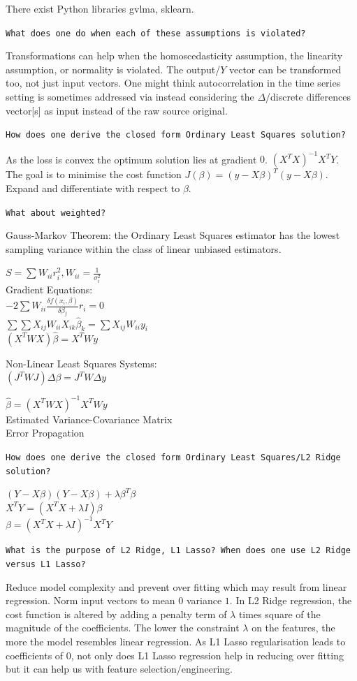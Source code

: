 There exist Python libraries gvlma, sklearn.

\texttt{What does one do when each of these assumptions is violated?}

Transformations can help when the homoscedasticity assumption, the linearity assumption, or normality is violated. The output/$Y$ vector can be transformed too, not just input vectors. One might think autocorrelation in the time series setting is sometimes addressed via instead considering the $\Delta$/discrete differences vector[s] as input instead of the raw source original.

\texttt{How does one derive the closed form Ordinary Least Squares solution?}

As the loss is convex the optimum solution lies at gradient $0$. $(X^T X)^{-1} X^T Y$. The goal is to minimise the cost function $J(\beta)=(y-X \beta)^T (y-X \beta)$. Expand and differentiate with respect to $\beta$.

\texttt{What about weighted?}

Gauss-Markov Theorem: the Ordinary Least Squares estimator has the lowest sampling variance within the class of linear unbiased estimators.

$S=\sum W_{ii}r_i^2, W_{ii}=\frac{1}{\sigma_i^2}$ \\
Gradient Equations: \\
$-2\sum W_{ii} \frac{\delta f(x_i,\beta)}{\delta \beta_j} r_i=0$ \\
$\sum \sum X_{ij}W_{ii}X_{ik}\hat{\beta}_k = \sum X_{ij} W_{ii} y_i$ \\
$(X^T W X)\hat{\beta}=X^T W y$

Non-Linear Least Squares Systems: \\
$(J^T W J)\Delta \beta=J^T W \Delta y$

$\hat{\beta}=(X^T W X)^{-1} X^T W y$ \\
Estimated Variance-Covariance Matrix \\
Error Propagation

\texttt{How does one derive the closed form Ordinary Least Squares/L2 Ridge solution?}

$(Y-X \beta)(Y-X \beta)+\lambda \beta^T \beta$ \\
$X^T Y=(X^T X+\lambda I)\beta$ \\
$\beta=(X^T X+\lambda I)^{-1} X^T Y$

\texttt{What is the purpose of L2 Ridge, L1 Lasso? When does one use L2 Ridge versus L1 Lasso?}

Reduce model complexity and prevent over fitting which may result from linear regression. Norm input vectors to mean $0$ variance $1$. In L2 Ridge regression, the cost function is altered by adding a penalty term of $\lambda$ times square of the magnitude of the coefficients. The lower the constraint $\lambda$ on the features, the more the model resembles linear regression. As L1 Lasso regularisation leads to coefficients of $0$, not only does L1 Lasso regression help in reducing over fitting but it can help us with feature selection/engineering.

